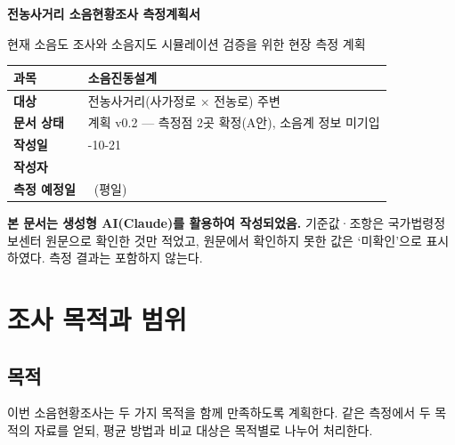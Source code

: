 \documentclass[10.5pt,a4paper]{article}
\renewcommand{\arraystretch}{1.25}
\newcommand{\IN}{[\quad]}
\newcommand{\notebox}[2][lab]{\par\noindent\colorbox{#1}{\parbox{\dimexpr\linewidth-2\fboxsep}{\small #2}}\par}
\begin{document}
\begin{titlepage}
\centering\vspace*{40mm}
{\sffamily\Huge\bfseries\color{navy} 전농사거리 소음현황조사 측정계획서\par}
\vspace{6mm}
{\sffamily\large 현재 소음도 조사와 소음지도 시뮬레이션 검증을 위한 현장 측정 계획\par}
\vspace{18mm}
{\renewcommand{\arraystretch}{1.5}
\begin{tabular}{>{\raggedright\arraybackslash}p{38mm}>{\raggedright\arraybackslash}p{90mm}}
\toprule
\cellcolor{headfill}\textbf{\sffamily 과목} & 소음진동설계 \\ \midrule
\cellcolor{headfill}\textbf{\sffamily 대상} & 전농사거리(사가정로 $\times$ 전농로) 주변 \\ \midrule
\cellcolor{headfill}\textbf{\sffamily 문서 상태} & 계획 v0.2 --- 측정점 2곳 확정(A안), 소음계 정보 미기입 \\ \midrule
\cellcolor{headfill}\textbf{\sffamily 작성일} & 2026-10-21 \\ \midrule
\cellcolor{headfill}\textbf{\sffamily 작성자} & \IN \\ \midrule
\cellcolor{headfill}\textbf{\sffamily 측정 예정일} & \IN\ (평일) \\
\bottomrule
\end{tabular}}
\vfill
\notebox{\textbf{본 문서는 생성형 AI(Claude)를 활용하여 작성되었음.} 기준값·조항은 국가법령정보센터 원문으로 확인한 것만 적었고, 원문에서 확인하지 못한 값은
`미확인'으로 표시하였다. 측정 결과는 포함하지 않는다.}
\end{titlepage}
\tableofcontents
\clearpage
{}\section{조사 목적과 범위}
\subsection{목적}
이번 소음현황조사는 두 가지 목적을 함께 만족하도록 계획한다. 같은 측정에서 두 목적의 자료를 얻되, 평균 방법과 비교 대상은 목적별로 나누어 처리한다.
\small
\end{document}
